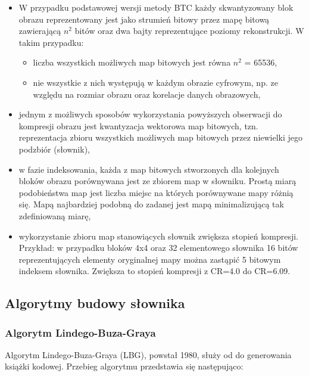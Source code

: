 \documentclass{article}
\begin{document}
\begin{itemize} 
\item W przypadku podstawowej wersji metody BTC każdy skwantyzowany blok obrazu reprezentowany jest jako strumień bitowy przez mapę bitową zawierającą $n^{2}$ bitów oraz dwa bajty reprezentujące poziomy rekonstrukcji. W takim przypadku:
     \begin{itemize}[label=$\star$]
        \item liczba wszystkich możliwych map bitowych jest równa $n^{2}$ = 65536,
        \item nie wszystkie z nich występują w każdym obrazie cyfrowym, np. ze względu na rozmiar obrazu oraz korelacje danych obrazowych, 
     \end{itemize}
\item jednym z możliwych sposobów wykorzystania powyższych obserwacji do kompresji obrazu jest kwantyzacja wektorowa map bitowych, tzn. reprezentacja zbioru wszystkich możliwych map bitowych przez niewielki jego podzbiór (słownik),
\item w fazie indeksowania, każda z map bitowych stworzonych dla kolejnych bloków obrazu porównywana jest ze zbiorem map w słowniku. Prostą miarą podobieństwa map jest liczba miejsc na których porównywane mapy różnią się. Mapą najbardziej podobną do zadanej jest mapą minimalizującą tak zdefiniowaną miarę,
\item wykorzystanie zbioru map stanowiących słownik zwiększa stopień kompresji. Przykład: w przypadku bloków 4x4 oraz 32 elementowego słownika 16 bitów reprezentujących elementy oryginalnej mapy można zastąpić 5 bitowym indeksem słownika. Zwiększa to stopień kompresji z CR=4.0 do CR=6.09.
\end{itemize}

\subsection{Algorytmy budowy słownika}

\subsubsection{Algorytm Lindego-Buza-Graya}

Algorytm Lindego-Buza-Graya (LBG), powstał 1980, służy od do generowania książki kodowej. Przebieg algorytmu przedstawia się następująco:
\end{document}
